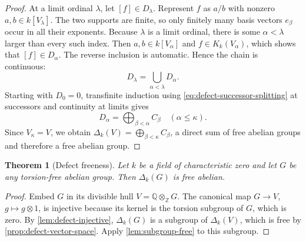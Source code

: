\documentclass[11pt,a4paper]{article}
\numberwithin{equation}{section}
\theoremstyle{plain}
\newtheorem{theorem}{Theorem}[section]
\theoremstyle{definition}
\theoremstyle{remark}
\newcommand{\Q}{\mathbb Q}
\newcommand{\Z}{\mathbb Z}
\newcommand{\Kk}[1]{K_k(#1)}
\newcommand{\Dk}[1]{\Delta_k(#1)}
\begin{document}
\begin{proof}
At a limit ordinal $\lambda$, let $[f]\in D_\lambda$.  Represent $f$ as
$a/b$ with nonzero $a,b\in k[V_\lambda]$.  The two supports are finite, so
only finitely many basis vectors $e_\beta$ occur in all their exponents.
Because $\lambda$ is a limit ordinal, there is some $\alpha<\lambda$
larger than every such index.  Then $a,b\in k[V_\alpha]$ and
$f\in\Kk{V_\alpha}$, which shows that $[f]\in D_\alpha$.  The reverse
inclusion is automatic.  Hence the chain is continuous:
\[
  D_\lambda=\bigcup_{\alpha<\lambda}D_\alpha.
\]
Starting with $D_0=0$, transfinite induction using
\cref{eq:defect-successor-splitting} at successors and continuity at limits
gives
\[
  D_\alpha=\bigoplus_{\beta<\alpha}C_\beta
  \quad(\alpha\leq\kappa).
\]
Since $V_\kappa=V$, we obtain
$\Dk V=\bigoplus_{\beta<\kappa}C_\beta$, a direct sum of free abelian
groups and therefore a free abelian group.
\end{proof}

\begin{theorem}[Defect freeness]\label{thm:defect-free}
Let $k$ be a field of characteristic zero and let $G$ be any torsion-free
abelian group.  Then $\Dk G$ is free abelian.
\end{theorem}

\begin{proof}
Embed $G$ in its divisible hull $V=\Q\otimes_{\Z}G$.  The canonical map
$G\to V$, $g\mapsto g\otimes1$, is injective because its
kernel is the torsion subgroup of $G$, which is zero.  By
\cref{lem:defect-injective}, $\Dk G$ is a subgroup of $\Dk V$, which is free
by \cref{prop:defect-vector-space}.  Apply \cref{lem:subgroup-free} to this
subgroup.
\end{proof}
\end{document}
